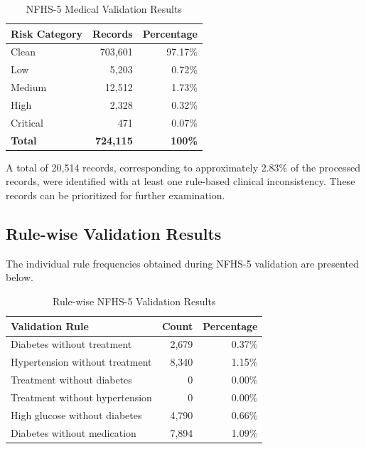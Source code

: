 \begin{table}[h!]
\centering
\begin{tabular}{|l|r|r|}
\hline
\textbf{Risk Category} & \textbf{Records} & \textbf{Percentage} \\
\hline
Clean & 703,601 & 97.17\% \\
\hline
Low & 5,203 & 0.72\% \\
\hline
Medium & 12,512 & 1.73\% \\
\hline
High & 2,328 & 0.32\% \\
\hline
Critical & 471 & 0.07\% \\
\hline
\textbf{Total} & \textbf{724,115} & \textbf{100\%} \\
\hline
\end{tabular}
\caption{NFHS-5 Medical Validation Results}
\label{tab:nfhs-results}
\end{table}

A total of 20,514 records, corresponding to approximately 2.83\% of the processed records, were identified with at least one rule-based clinical inconsistency. These records can be prioritized for further examination.

\subsection{Rule-wise Validation Results}

The individual rule frequencies obtained during NFHS-5 validation are presented below.

\begin{table}[h!]
\centering
\begin{tabular}{|l|r|r|}
\hline
\textbf{Validation Rule} & \textbf{Count} & \textbf{Percentage} \\
\hline
Diabetes without treatment & 2,679 & 0.37\% \\
\hline
Hypertension without treatment & 8,340 & 1.15\% \\
\hline
Treatment without diabetes & 0 & 0.00\% \\
\hline
Treatment without hypertension & 0 & 0.00\% \\
\hline
High glucose without diabetes & 4,790 & 0.66\% \\
\hline
Diabetes without medication & 7,894 & 1.09\% \\
\hline
\end{tabular}
\caption{Rule-wise NFHS-5 Validation Results}
\label{tab:nfhs-rules}
\end{table}


